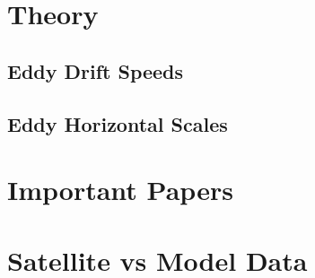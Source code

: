 \label{chap:intro}

\section{Theory}

\subsection{Eddy Drift Speeds}\label{subsec:speeds}

\subsection{Eddy Horizontal Scales}

\section{Important Papers}

\section{Satellite vs Model Data} \label{sec:satvsmod}

